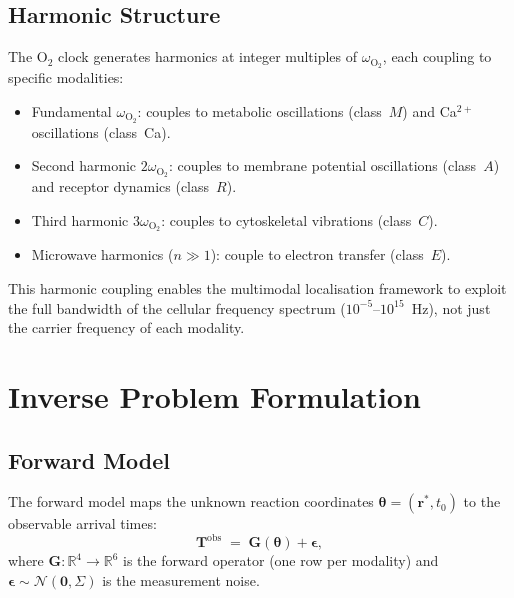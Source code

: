 \subsection{Harmonic Structure}

The O$_2$ clock generates harmonics at integer multiples of
$\omega_\mathrm{O_2}$, each coupling to specific modalities:
\begin{itemize}[noitemsep]
    \item Fundamental $\omega_\mathrm{O_2}$: couples to metabolic oscillations
          (class~$M$) and Ca$^{2+}$ oscillations (class~Ca).
    \item Second harmonic $2\omega_\mathrm{O_2}$: couples to membrane
          potential oscillations (class~$A$) and receptor dynamics (class~$R$).
    \item Third harmonic $3\omega_\mathrm{O_2}$: couples to cytoskeletal
          vibrations (class~$C$).
    \item Microwave harmonics ($n \gg 1$): couple to electron transfer
          (class~$E$).
\end{itemize}
This harmonic coupling enables the multimodal localisation framework to exploit
the full bandwidth of the cellular frequency spectrum
($10^{-5}$--$10^{15}$~Hz), not just the carrier frequency of each modality.

\section{Inverse Problem Formulation}
\label{sec:inverse-problem}

\subsection{Forward Model}

The forward model maps the unknown reaction coordinates $\boldsymbol{\theta}
= (\mathbf{r}^*, t_0)$ to the observable arrival times:
\begin{equation}
    \mathbf{T}^\mathrm{obs}
    \;=\; \mathbf{G}(\boldsymbol{\theta}) + \boldsymbol{\epsilon},
    \label{eq:forward-model}
\end{equation}
where $\mathbf{G}: \mathbb{R}^4 \to \mathbb{R}^6$ is the forward operator
(one row per modality) and $\boldsymbol{\epsilon} \sim \mathcal{N}(\mathbf{0},
\Sigma)$ is the measurement noise.

